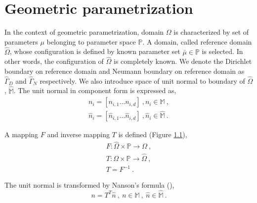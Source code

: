 \documentclass[a4paper,oneside,openright,spanish,english]{book}
\begin{document}
\chapter{Geometric parametrization}

In the context of geometric parametrization, domain $\Omega$ is characterized by set of parameters $\mu$ belonging to parameter space $\mathbb{P}$. A domain, called reference domain $\hat{\Omega}$, whose configuration is defined by known parameter set $\bar{\mu} \in \mathbb{P}$ is selected. In other words, the configuration of $\hat{\Omega}$ is completely known. We denote the Dirichlet boundary on reference domain and Neumann boundary on reference domain as $\hat{\Gamma}_D$ and  $\hat{\Gamma}_N$ respectively. We also introduce space of unit normal to boundary of $\hat{\Omega}$, $\hat{\mathbb{M}}$. The unit normal in component form is expressed as,
\begin{gather}
n_i = [n_{i,1} \ldots n_{i,d}] \ , n_i \in \mathbb{M} \ , \\
\hat{n}_{i} = [\hat{n}_{i,1} \ldots \hat{n}_{i,d}] \ , \hat{n}_{i} \in \hat{\mathbb{M}} \ .
\end{gather}

A mapping $F$ and inverse mapping $T$ is defined (Figure \ref{ref_domain_parametrized_domain}),
\begin{equation}
\begin{split}
F : \hat{\Omega} \times \mathbb{P} \rightarrow \Omega \ , \\
T : \Omega \times \mathbb{P} \rightarrow \hat{\Omega} \ , \\
T = F^{-1} \ .
\end{split}
\end{equation}

The unit normal is transformed by Nanson's formula (\cite{nanson_formula}),
\begin{equation}
n = T^T \hat{n} \ , \ n \in \mathbb{M} \ , \ \hat{n} \in \hat{\mathbb{M}} \ .
\end{equation}

\begin{figure}
\label{ref_domain_parametrized_domain}
\end{figure}
\end{document}
